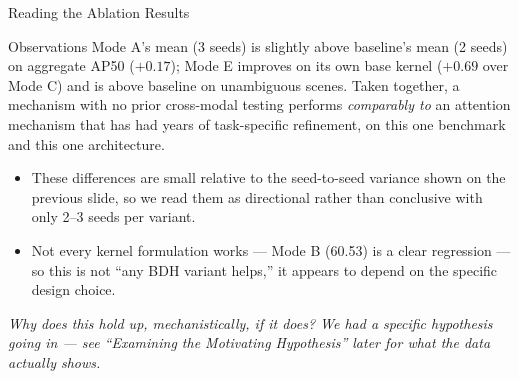 \documentclass[aspectratio=169]{beamer}
\begin{document}
\begin{frame}{Reading the Ablation Results}
  \begin{block}{Observations}
    \small Mode A's mean (3 seeds) is slightly above baseline's mean (2
    seeds) on aggregate AP50 ($+0.17$); Mode E improves on its own base
    kernel ($+0.69$ over Mode C) and is above baseline on unambiguous
    scenes. Taken together, a mechanism with no prior cross-modal
    testing performs \emph{comparably to} an attention mechanism that
    has had years of task-specific refinement, on this one benchmark
    and this one architecture.
  \end{block}
  \vspace{0.2cm}
  \small
  \begin{itemize}
    \item These differences are small relative to the seed-to-seed
      variance shown on the previous slide, so we read them as
      directional rather than conclusive with only 2--3 seeds per
      variant.
    \item Not every kernel formulation works — Mode B (60.53) is a
      clear regression — so this is not ``any BDH variant helps,'' it
      appears to depend on the specific design choice.
  \end{itemize}
  \vspace{0.2cm}
  \small\textit{Why does this hold up, mechanistically, if it does?
  We had a specific hypothesis going in — see ``Examining the
  Motivating Hypothesis'' later for what the data actually shows.}
\end{frame}
\end{document}
